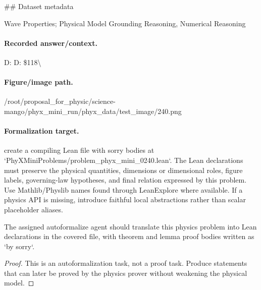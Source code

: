 \#\# Dataset metadata

Wave Properties; Physical Model Grounding Reasoning, Numerical Reasoning

\paragraph{Recorded answer/context.}
D: D: \$118\textbackslash{}

\paragraph{Figure/image path.}
/root/proposal\_for\_physic/science-mango/phyx\_mini\_run/phyx\_data/test\_image/240.png

\paragraph{Formalization target.}
create a compiling Lean file with sorry bodies at `PhyXMiniProblems/problem\_phyx\_mini\_0240.lean`. The Lean declarations must preserve the physical quantities, dimensions or dimensional roles, figure labels, governing-law hypotheses, and final relation expressed by this problem.
Use Mathlib/Physlib names found through LeanExplore where available. If a physics API is missing, introduce faithful local abstractions rather than scalar placeholder aliases.

\begin{theorem}
\label{thm:physics:phyx_mini_0240:target}
The assigned autoformalize agent should translate this physics problem into Lean declarations in the covered file, with theorem and lemma proof bodies written as `by sorry`.
\end{theorem}
\begin{proof}
This is an autoformalization task, not a proof task. Produce statements that can later be proved by the physics prover without weakening the physical model.
\end{proof}

